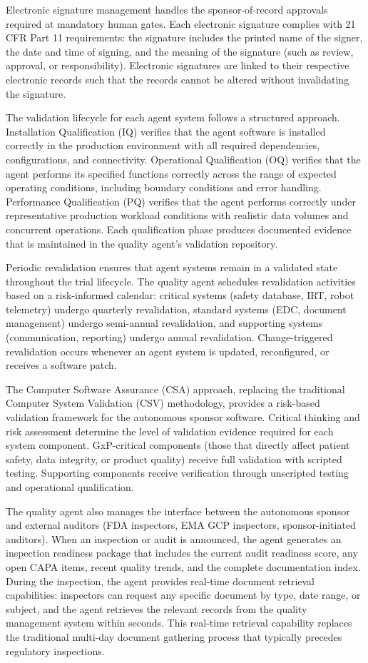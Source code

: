 Electronic signature management handles the sponsor-of-record approvals required at
mandatory human gates. Each electronic signature complies with 21 CFR Part 11 requirements:
the signature includes the printed name of the signer, the date and time of signing, and the
meaning of the signature (such as review, approval, or responsibility). Electronic
signatures are linked to their respective electronic records such that the records cannot
be altered without invalidating the signature.

The validation lifecycle for each agent system follows a structured approach. Installation
Qualification (IQ) verifies that the agent software is installed correctly in the production
environment with all required dependencies, configurations, and connectivity. Operational
Qualification (OQ) verifies that the agent performs its specified functions correctly across
the range of expected operating conditions, including boundary conditions and error handling.
Performance Qualification (PQ) verifies that the agent performs correctly under
representative production workload conditions with realistic data volumes and concurrent
operations. Each qualification phase produces documented evidence that is maintained in the
quality agent's validation repository.

Periodic revalidation ensures that agent systems remain in a validated state throughout
the trial lifecycle. The quality agent schedules revalidation activities based on a
risk-informed calendar: critical systems (safety database, IRT, robot telemetry)
undergo quarterly revalidation, standard systems (EDC, document management) undergo
semi-annual revalidation, and supporting systems (communication, reporting)
undergo annual revalidation. Change-triggered revalidation occurs whenever an agent
system is updated, reconfigured, or receives a software patch.

The Computer Software Assurance (CSA) approach, replacing the traditional Computer System
Validation (CSV) methodology, provides a risk-based validation framework for the autonomous
sponsor software. Critical thinking and risk assessment determine the level of validation
evidence required for each system component. GxP-critical components (those that directly
affect patient safety, data integrity, or product quality) receive full validation with
scripted testing. Supporting components receive verification through unscripted testing and
operational qualification.

The quality agent also manages the interface between the autonomous sponsor and external
auditors (FDA inspectors, EMA GCP inspectors, sponsor-initiated auditors). When an
inspection or audit is announced, the agent generates an inspection readiness package that
includes the current audit readiness score, any open CAPA items, recent quality trends,
and the complete documentation index. During the inspection, the agent provides real-time
document retrieval capabilities: inspectors can request any specific document by type,
date range, or subject, and the agent retrieves the relevant records from the quality
management system within seconds. This real-time retrieval capability replaces the
traditional multi-day document gathering process that typically precedes regulatory
inspections.

